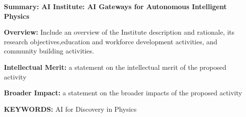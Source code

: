 \documentclass[10pt]{SelfArx}
\begin{document}
\pagestyle{plain}

\begin{center}
\textbf{Summary: AI Institute: AI Gateways for Autonomous Intelligent Physics}
\end{center}

\setlength{\parindent}{1em}
\setlength{\parskip}{1em}
 
\textbf{\Large Overview:} Include an overview of the Institute description and rationale, its research objectives,education and workforce development activities, and community building activities.

\setlength{\parindent}{1em}
\setlength{\parskip}{1em}
 
\textbf{\Large Intellectual Merit:}  a statement on the intellectual merit of the proposed activity

\setlength{\parindent}{1em}
\setlength{\parskip}{1em}
 
\textbf{\Large Broader Impact:} a statement on the broader impacts of the proposed activity
\setlength{\parindent}{1em}
\setlength{\parskip}{1em}
 
\textbf{KEYWORDS:} AI for Discovery in Physics 
\end{document}
